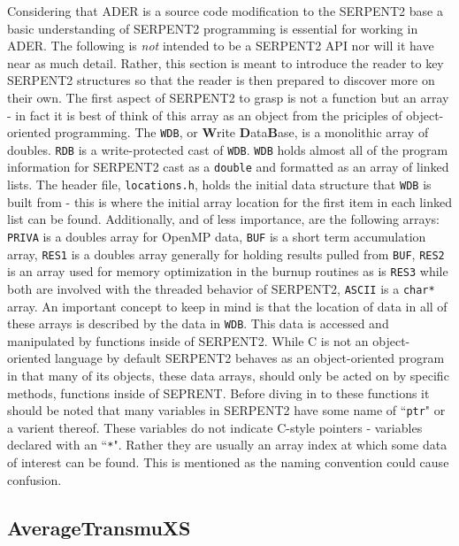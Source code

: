 Considering that ADER is a source code modification to the SERPENT2 base a basic
understanding of SERPENT2 programming is essential for working in ADER. The
following is \textit{not} intended to be a SERPENT2 API nor will it have near
as much detail. Rather, this section is meant to introduce the reader to key
SERPENT2 structures so that the reader is then prepared to discover more
on their own.
The first aspect of SERPENT2 to grasp is not a function but an array - in fact
it is best of think of this array as an object from the priciples of
object-oriented programming. The \texttt{WDB}, or 
\textbf{W}rite \textbf{D}ata\textbf{B}ase, is a monolithic array of doubles.
\texttt{RDB} is a write-protected cast of \texttt{WDB}. \texttt{WDB} holds
almost all of the program information for SERPENT2 cast as a \texttt{double} and
formatted as an array of linked lists.
The header file, \texttt{locations.h}, holds the initial data structure that
\texttt{WDB} is built from - this is where the initial array location for
the first item in each linked list can be found.
Additionally, and of less importance, are the following arrays: \texttt{PRIVA}
is a doubles array for OpenMP data, \texttt{BUF} is a short term accumulation
array, \texttt{RES1} is a doubles array generally for holding results pulled
from \texttt{BUF}, \texttt{RES2} is an array used for memory optimization in the
burnup routines as is \texttt{RES3} while both are involved with the threaded
behavior of SERPENT2, \texttt{ASCII} is a \texttt{char*} array.
An important concept to keep in mind is that the location of data in all of
these arrays is described by the data in \texttt{WDB}. This data is accessed and
manipulated by functions inside of SERPENT2. While C is not an object-oriented
language by default SERPENT2 behaves as an object-oriented program in that
many of its objects, these data arrays, should only be acted on by specific
methods, functions inside of SEPRENT.  Before diving in to these
functions it should be noted that many variables in SERPENT2 have some name of
``\texttt{ptr}" or a varient thereof. These variables do not indicate C-style
pointers - variables declared with an ``\texttt{*}". Rather they are usually
an array index at which some data of interest can be found. This is mentioned
as the naming convention could cause confusion.

\subsection{AverageTransmuXS}


